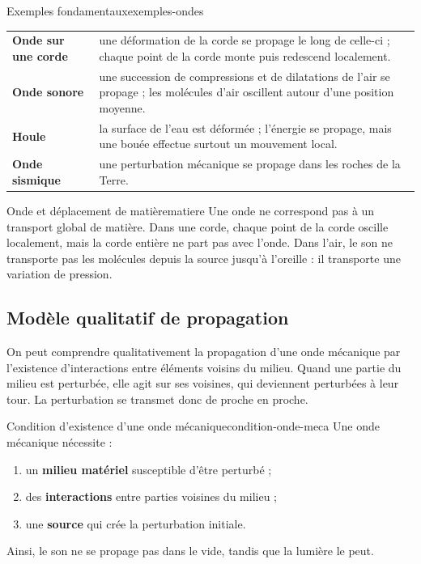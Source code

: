 \documentclass[11pt,a4paper]{article}
\begin{document}
\begin{examplebox}{Exemples fondamentaux}{exemples-ondes}
\begin{tabularx}{\textwidth}{>{\bfseries}lX}
Onde sur une corde & une déformation de la corde se propage le long de celle-ci ; chaque point de la corde monte puis redescend localement.\\
Onde sonore & une succession de compressions et de dilatations de l'air se propage ; les molécules d'air oscillent autour d'une position moyenne.\\
Houle & la surface de l'eau est déformée ; l'énergie se propage, mais une bouée effectue surtout un mouvement local.\\
Onde sismique & une perturbation mécanique se propage dans les roches de la Terre.\\
\end{tabularx}
\end{examplebox}

\begin{warningbox}{Onde et déplacement de matière}{matiere}
Une onde ne correspond pas à un transport global de matière. Dans une corde, chaque point de la corde oscille localement, mais la corde entière ne part pas avec l'onde. Dans l'air, le son ne transporte pas les molécules depuis la source jusqu'à l'oreille : il transporte une variation de pression.
\end{warningbox}

\subsection{Modèle qualitatif de propagation}

On peut comprendre qualitativement la propagation d'une onde mécanique par l'existence d'interactions entre éléments voisins du milieu. Quand une partie du milieu est perturbée, elle agit sur ses voisines, qui deviennent perturbées à leur tour. La perturbation se transmet donc de proche en proche.

\begin{propositionbox}{Condition d'existence d'une onde mécanique}{condition-onde-meca}
Une onde mécanique nécessite :
\begin{enumerate}[label=\arabic*)]
  \item un \textbf{milieu matériel} susceptible d'être perturbé ;
  \item des \textbf{interactions} entre parties voisines du milieu ;
  \item une \textbf{source} qui crée la perturbation initiale.
\end{enumerate}
Ainsi, le son ne se propage pas dans le vide, tandis que la lumière le peut.
\end{propositionbox}
\end{document}
